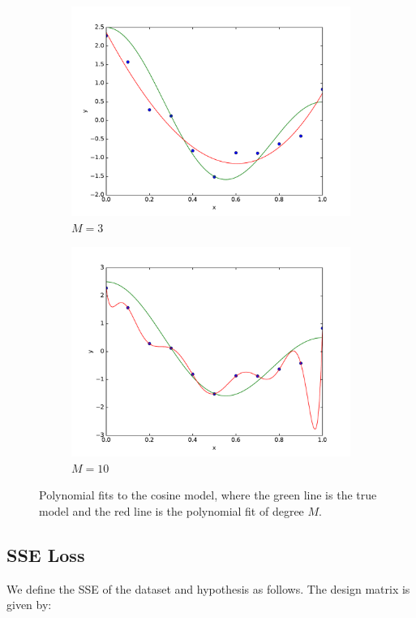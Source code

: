 \documentclass[10pt,psamsfonts]{amsart}
\theoremstyle{definition}
\theoremstyle{remark}
\numberwithin{equation}{section}
\begin{document}
\begin{figure}
\begin{subfigure}[b]{0.24\textwidth}
		\includegraphics[width=\textwidth]{hw1_2-1_3.pdf}
		\caption{$M=3$}
	\end{subfigure}
	\begin{subfigure}[b]{0.24\textwidth}
		\includegraphics[width=\textwidth]{hw1_2-1_10.pdf}
		\caption{$M=10$}
	\end{subfigure}
	\caption{Polynomial fits to the cosine model, where the green line is the true model and the red line is the polynomial fit of degree $M$.}
\end{figure}

\subsection{SSE Loss} We define the SSE of the dataset and hypothesis as follows. The design matrix is given by:
\end{document}
